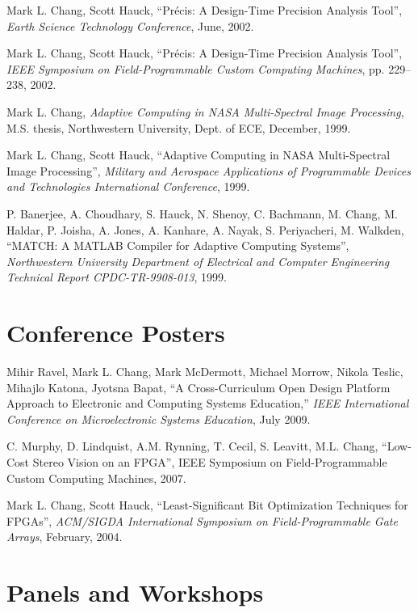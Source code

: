 \documentclass[line]{res}
\begin{document}
\begin{resume}
	Mark L. Chang, Scott Hauck, ``Pr\'{e}cis: A Design-Time Precision Analysis Tool'', \emph{Earth Science Technology Conference}, June, 2002.
	
	Mark L. Chang, Scott Hauck, ``Pr\'{e}cis: A Design-Time Precision Analysis Tool'', \emph{IEEE Symposium on Field-Programmable Custom Computing Machines}, pp. 229--238, 2002.
	
	Mark L. Chang, \emph{Adaptive Computing in NASA Multi-Spectral Image Processing}, M.S. thesis, Northwestern University, Dept. of ECE, December, 1999.
	
	Mark L. Chang, Scott Hauck, ``Adaptive Computing in NASA Multi-Spectral Image Processing'', \emph{Military and Aerospace Applications of Programmable Devices and Technologies International Conference}, 1999.
	
	P. Banerjee, A. Choudhary, S. Hauck, N. Shenoy, C. Bachmann, M. Chang, M. Haldar, P. Joisha, A. Jones, A. Kanhare, A. Nayak, S. Periyacheri, M. Walkden, ``MATCH: A MATLAB Compiler for Adaptive Computing Systems'', \emph{Northwestern University Department of Electrical and Computer Engineering Technical Report CPDC-TR-9908-013}, 1999.
	
	\section{\sc Conference Posters}
	
	Mihir Ravel, Mark L. Chang, Mark McDermott, Michael Morrow, Nikola Teslic, Mihajlo Katona, Jyotsna Bapat, ``A Cross-Curriculum Open Design Platform Approach to Electronic and Computing Systems Education,'' \emph{IEEE International Conference on Microelectronic Systems Education}, July 2009. 
	
	C. Murphy, D. Lindquist, A.M. Rynning, T. Cecil, S. Leavitt, M.L. Chang, ``Low-Cost Stereo Vision on an FPGA'', IEEE Symposium on Field-Programmable Custom Computing Machines, 2007.
	
	Mark L. Chang, Scott Hauck, ``Least-Significant Bit Optimization Techniques for FPGAs'', \emph{ACM/SIGDA International Symposium on Field-Programmable Gate Arrays}, February, 2004.
	
	\section{\sc Panels and Workshops}
	

\end{resume}
\end{document}

